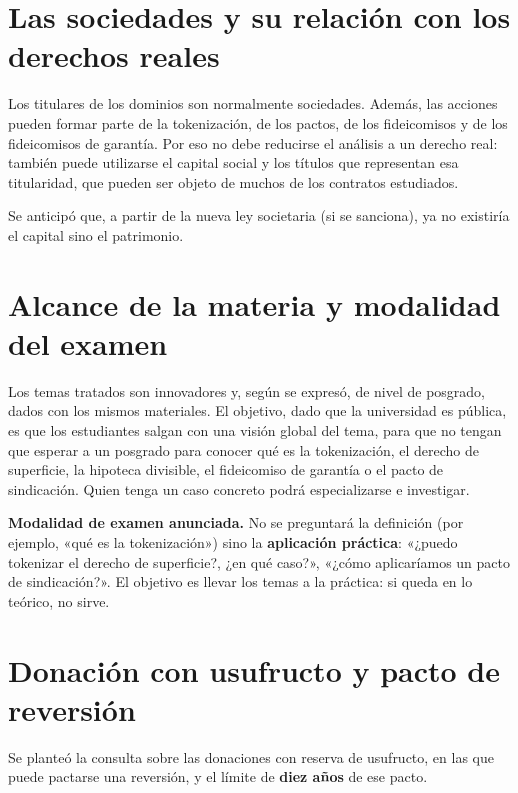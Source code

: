 \documentclass[12pt,oneside]{book}
\begin{document}
\section{Las sociedades y su relación con los derechos reales}

Los titulares de los dominios son normalmente sociedades. Además, las acciones pueden formar parte de la tokenización, de los pactos, de los fideicomisos y de los fideicomisos de garantía. Por eso no debe reducirse el análisis a un derecho real: también puede utilizarse el capital social y los títulos que representan esa titularidad, que pueden ser objeto de muchos de los contratos estudiados.

\begin{note}
Se anticipó que, a partir de la nueva ley societaria (si se sanciona), ya no existiría el capital sino el patrimonio.
\end{note}

\section{Alcance de la materia y modalidad del examen}

Los temas tratados son innovadores y, según se expresó, de nivel de posgrado, dados con los mismos materiales. El objetivo, dado que la universidad es pública, es que los estudiantes salgan con una visión global del tema, para que no tengan que esperar a un posgrado para conocer qué es la tokenización, el derecho de superficie, la hipoteca divisible, el fideicomiso de garantía o el pacto de sindicación. Quien tenga un caso concreto podrá especializarse e investigar.

\begin{important}
\textbf{Modalidad de examen anunciada.} No se preguntará la definición (por ejemplo, «qué es la tokenización») sino la \textbf{aplicación práctica}: «¿puedo tokenizar el derecho de superficie?, ¿en qué caso?», «¿cómo aplicaríamos un pacto de sindicación?». El objetivo es llevar los temas a la práctica: si queda en lo teórico, no sirve.
\end{important}

\section{Donación con usufructo y pacto de reversión}

Se planteó la consulta sobre las donaciones con reserva de usufructo, en las que puede pactarse una reversión, y el límite de \textbf{diez años} de ese pacto.
\end{document}

